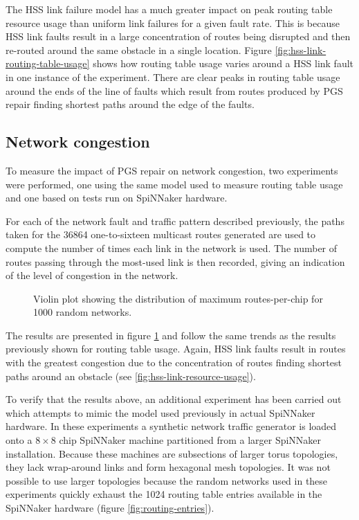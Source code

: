 			The HSS link failure model has a much greater impact on peak routing
			table resource usage than uniform link failures for a given fault rate.
			This is because HSS link faults result in a large concentration of routes
			being disrupted and then re-routed around the same obstacle in a single
			location. Figure \ref{fig:hss-link-routing-table-usage} shows how routing
			table usage varies around a HSS link fault in one instance of the
			experiment. There are clear peaks in routing table usage around the ends
			of the line of faults which result from routes produced by PGS repair
			finding shortest paths around the edge of the faults.
		
		\subsection{Network congestion}
			
			To measure the impact of PGS repair on network congestion, two
			experiments were performed, one using the same model used to measure
			routing table usage and one based on tests run on SpiNNaker hardware.
			
			For each of the network fault and traffic pattern described previously,
			the paths taken for the \num{36864} one-to-sixteen multicast routes
			generated are used to compute the number of times each link in the
			network is used. The number of routes passing through the most-used link
			is then recorded, giving an indication of the level of congestion in the
			network.
			
			\begin{figure}
				\center
				
				\caption{Violin plot showing the distribution of maximum
				routes-per-chip for \num{1000} random networks.}
				\label{fig:routing-resource}
			\end{figure}
			
			The results are presented in figure \ref{fig:routing-resource} and follow
			the same trends as the results previously shown for routing table usage.
			Again, HSS link faults result in routes with the greatest congestion due
			to the concentration of routes finding shortest paths around an obstacle
			(see \ref{fig:hss-link-resource-usage}).
			
			To verify that the results above, an additional experiment has been
			carried out which attempts to mimic the model used previously in actual
			SpiNNaker hardware. In these experiments a synthetic network traffic
			generator is loaded onto a $8\times8$ chip SpiNNaker machine partitioned
			from a larger SpiNNaker installation.  Because these machines are
			subsections of larger torus topologies, they lack wrap-around links and
			form hexagonal mesh topologies. It was not possible to use larger
			topologies because the random networks used in these experiments quickly
			exhaust the \num{1024} routing table entries available in the SpiNNaker
			hardware (figure \ref{fig:routing-entries}).
			

